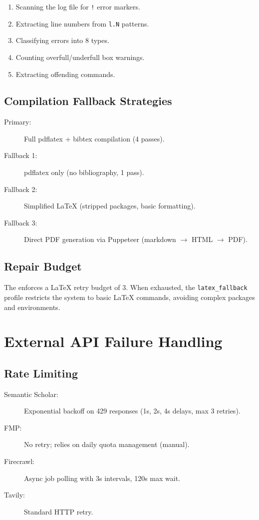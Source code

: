 \begin{enumerate}
  \item Scanning the log file for \texttt{!} error markers.
  \item Extracting line numbers from \texttt{l.N} patterns.
  \item Classifying errors into 8 types.
  \item Counting overfull/underfull box warnings.
  \item Extracting offending commands.
\end{enumerate}

\subsection{Compilation Fallback Strategies}

\begin{description}
  \item[Primary:] Full pdflatex + bibtex compilation (4 passes).
  \item[Fallback 1:] pdflatex only (no bibliography, 1 pass).
  \item[Fallback 2:] Simplified \LaTeX{} (stripped packages, basic formatting).
  \item[Fallback 3:] Direct PDF generation via Puppeteer (markdown $\to$ HTML $\to$ PDF).
\end{description}

\subsection{Repair Budget}

The \governor enforces a \LaTeX{} retry budget of 3.
When exhausted, the \texttt{latex\_fallback} profile restricts the system to basic \LaTeX{} commands, avoiding complex packages and environments.

\section{External API Failure Handling}
\label{sec:failure:api}

\subsection{Rate Limiting}

\begin{description}
  \item[Semantic Scholar:] Exponential backoff on 429 responses (1s, 2s, 4s delays, max 3 retries).
  \item[FMP:] No retry; relies on daily quota management (manual).
  \item[Firecrawl:] Async job polling with 3s intervals, 120s max wait.
  \item[Tavily:] Standard HTTP retry.
\end{description}

